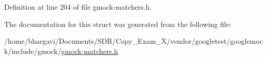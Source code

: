 Definition at line 204 of file gmock-\/matchers.\+h.



The documentation for this struct was generated from the following file\+:\begin{DoxyCompactItemize}
\item 
/home/bhargavi/\+Documents/\+S\+D\+R/\+Copy\+\_\+\+Exam\+\_\+X/vendor/googletest/googlemock/include/gmock/\hyperlink{gmock-matchers_8h}{gmock-\/matchers.\+h}\end{DoxyCompactItemize}
